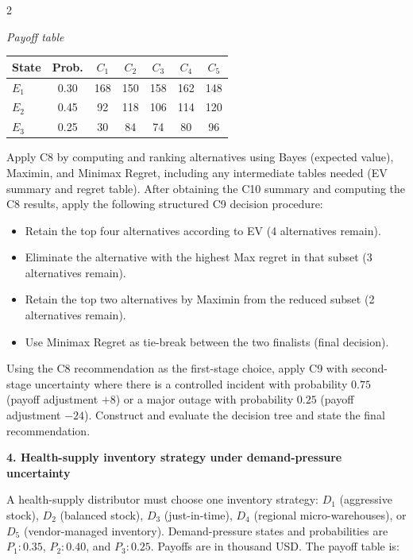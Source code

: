 \documentclass[12pt]{article}
\newcommand{\SubsectionBox}[1]{%
	\noindent\colorbox{gray!30}{%
		\parbox{\linewidth}{\textbf{#1}}%
	}\par\vspace{0.35cm}%
}
\begin{document}
\begin{multicols}{2}
		\begin{center}
			\textit{Payoff table} \\
			\begin{tabular}{l c c c c c c}
				\hline
				State& Prob. & $C_1$ & $C_2$ & $C_3$ & $C_4$ & $C_5$ \\
				\hline
				$E_1$ & 0.30 & 168 & 150 & 158 & 162 & 148 \\
				$E_2$ & 0.45 & 92 & 118 & 106 & 114 & 120 \\
				$E_3$ & 0.25 & 30 & 84 & 74 & 80 & 96 \\
				\hline
			\end{tabular}
		\end{center}
		
		Apply C8 by computing and ranking alternatives using Bayes (expected value), Maximin, and Minimax Regret, including any intermediate tables needed (EV summary and regret table).
		After obtaining the C10 summary and computing the C8 results, apply the following structured C9 decision procedure:
		\begin{itemize}
			\item Retain the top four alternatives according to EV (4 alternatives remain).
			\item Eliminate the alternative with the highest Max regret in that subset (3 alternatives remain).
			\item Retain the top two alternatives by Maximin from the reduced subset (2 alternatives remain).
			\item Use Minimax Regret as tie-break between the two finalists (final decision).
		\end{itemize}
		Using the C8 recommendation as the first-stage choice, apply C9 with second-stage uncertainty where there is a controlled incident with probability $0.75$ (payoff adjustment $+8$) or a major outage with probability $0.25$ (payoff adjustment $-24$). Construct and evaluate the decision tree and state the final recommendation.
		
		\vspace{0.25cm}
		\SubsectionBox{4. Health-supply inventory strategy under demand-pressure uncertainty}\vspace{-0.25cm}
		A health-supply distributor must choose one inventory strategy: $D_1$ (aggressive stock), $D_2$ (balanced stock), $D_3$ (just-in-time), $D_4$ (regional micro-warehouses), or $D_5$ (vendor-managed inventory).
		Demand-pressure states and probabilities are $P_1:0.35$, $P_2:0.40$, and $P_3:0.25$. Payoffs are in thousand USD. The payoff table is:
		

\end{multicols}
\end{document}
